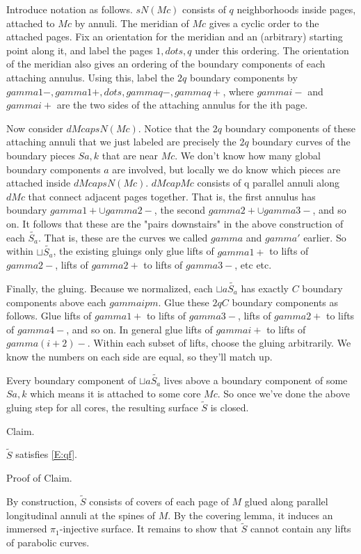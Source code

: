 \documentclass[12pt]{amsart}
\theoremstyle{definition}
\theoremstyle{remark}
\begin{document}
Introduce notation as follows. $sN(Mc)$ consists of $q$ neighborhoods inside
pages, attached to $Mc$ by annuli. The meridian of $Mc$ gives a cyclic order to
the attached pages.  Fix an orientation for the meridian and an (arbitrary)
starting point along it, and label the pages $1, dots, q$ under this ordering.
The orientation of the meridian also gives an ordering of the boundary
components of each attaching annulus.  Using this, label the $2q$ boundary
components by $gamma1-,gamma1+,dots, gammaq-,gammaq+$, where $gammai-$ and
$gammai+$ are the two sides of the attaching annulus for the ith page.

Now consider $dM cap sN(Mc)$. Notice that the $2q$ boundary components of these
attaching annuli that we just labeled are precisely the $2q$ boundary curves of
the boundary pieces $Sa,k$ that are near $Mc$. We don't know how many global
boundary components $a$ are involved, but locally we do know which pieces are
attached inside $dM cap sN(Mc)$. $dM cap Mc$ consists of q parallel annuli
along $dMc$ that connect adjacent pages together. That is, the first annulus
has boundary $gamma1+ \cup gamma2-$, the second $gamma2+ \cup gamma3-$, and so
on.  It follows that these are the "pairs downstairs" in the above construction
of each $\widetilde{S_a}$. That is, these are the curves we called $gamma$ and $gamma'$
earlier.  So within $\sqcup \widetilde{S_a}$, the existing gluings only glue lifts of
$gamma1+$ to lifts of $gamma2-$, lifts of $gamma2+$ to lifts of $gamma3-$, etc
etc.

Finally, the gluing. Because we normalized, each $\sqcup a \widetilde{S_a}$ has exactly
$C$ boundary components above each $gammaipm$.  Glue these $2qC$ boundary
components as follows. Glue lifts of $gamma1+$ to lifts of $gamma3-$, lifts of
$gamma2+$ to lifts of $gamma4-$, and so on. In general glue lifts of $gammai+$
to lifts of $gamma(i+2)-$. Within each subset of lifts, choose the gluing
arbitrarily. We know the numbers on each side are equal, so they'll match up.

Every boundary component of $\sqcup a \widetilde{S_a}$ lives above a boundary component
of some $Sa,k$ which means it is attached to some core $Mc$. So once we've done
the above gluing step for all cores, the resulting surface $\widetilde{S}$ is closed.

Claim.

$\widetilde{S}$ satisfies \eqref{E:qf}.

Proof of Claim.

By construction, $\widetilde{S}$ consists of covers of each page of $M$ glued along
parallel longitudinal annuli at the spines of $M$. By the covering lemma, it
induces an immersed $\pi_1$-injective surface. It remains to show that
$\widetilde{S}$ cannot contain any lifts of parabolic curves.
\end{document}
